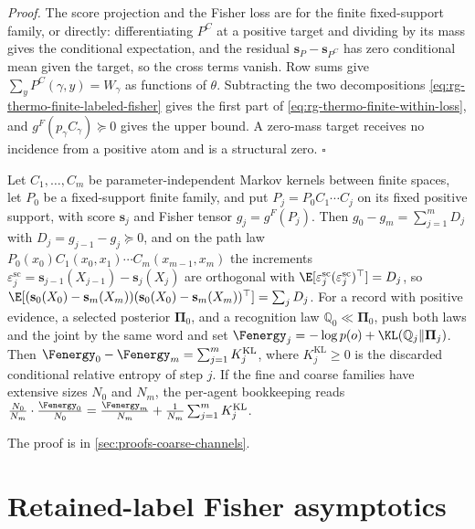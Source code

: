 \noindent\emph{Proof.}
The score projection and the Fisher loss are  for the finite
fixed-support family, or directly: differentiating $P^C$ at a positive target and dividing by its
mass gives the conditional expectation, and the residual $\mathbf s_P-\mathbf s_{P^C}$ has zero
conditional mean given the target, so the cross terms vanish. Row sums give
$\sum_yP^C(\gamma,y)=W_\gamma$ as functions of $\theta$. Subtracting the two decompositions
\eqref{eq:rg-thermo-finite-labeled-fisher} gives the first part of
\eqref{eq:rg-thermo-finite-within-loss}, and $g^F(p_\gamma C_\gamma)\succeq0$ gives the upper bound.
A zero-mass target receives no incidence from a positive atom and is a structural zero. $\square$

\label{eq:rg-thermo-account-score-telescope}
\label{eq:rg-thermo-account-vfe-telescope}
\label{eq:rg-thermo-account-vfe-area}
Let $C_1,\ldots,C_m$ be parameter-independent Markov kernels between finite spaces, let $P_0$ be a
fixed-support finite family, and put $P_j=P_0C_1\cdots C_j$ on its fixed positive support, with
score $\mathbf s_j$ and Fisher tensor $g_j=g^F(P_j)$. Then $g_0-g_m=\sum_{j=1}^mD_j$ with
$D_j=g_{j-1}-g_j\succeq0$, and on the path law $P_0(x_0)C_1(x_0,x_1)\cdots C_m(x_{m-1},x_m)$ the
increments $\varepsilon^{\mathrm{sc}}_j=\mathbf s_{j-1}(X_{j-1})-\mathbf s_j(X_j)$ are orthogonal
with $\E[\varepsilon^{\mathrm{sc}}_j(\varepsilon^{\mathrm{sc}}_j)^\top]=D_j$, so
$\E[(\mathbf s_0(X_0)-\mathbf s_m(X_m))(\mathbf s_0(X_0)-\mathbf s_m(X_m))^\top]=\sum_jD_j$. For a
record with positive evidence, a selected posterior $\boldsymbol\Pi_0$, and a recognition law
$\mathbb Q_0\ll\boldsymbol\Pi_0$, push both laws and the joint by the same word and set
$\Fenergy_j=-\log p(o)+\KL(\mathbb Q_j\Vert\boldsymbol\Pi_j)$. Then
$\Fenergy_0-\Fenergy_m=\sum_{j=1}^mK^{\mathrm{KL}}_j$, where $K^{\mathrm{KL}}_j\geq0$ is the
discarded conditional relative entropy of step $j$. If the fine and
coarse families have extensive sizes $N_0$ and $N_m$, the per-agent bookkeeping reads
$\tfrac{N_0}{N_m}\cdot\tfrac{\Fenergy_0}{N_0}=\tfrac{\Fenergy_m}{N_m}+\tfrac{1}{N_m}\sum_{j=1}^mK^{\mathrm{KL}}_j$.

The proof is in \cref{sec:proofs-coarse-channels}.

\section{Retained-label Fisher asymptotics}
\label{sec:cg-retained-label-asymptotics}

